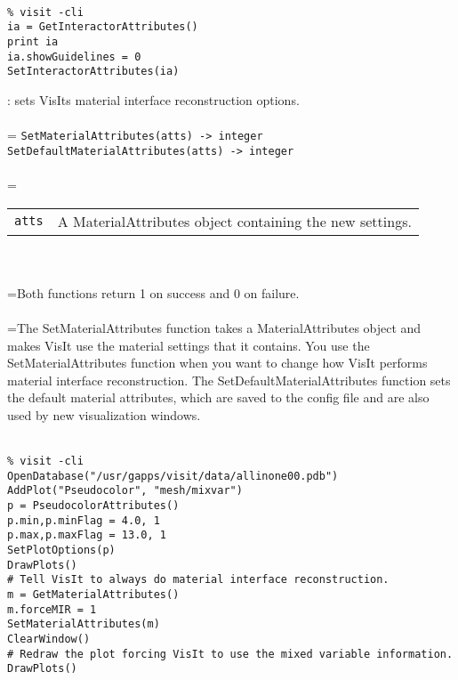 \documentclass[10pt,a4paper]{report}
\begin{document}
\\[-6mm]
\begin{verbatim}% visit -cli
ia = GetInteractorAttributes()
print ia
ia.showGuidelines = 0
SetInteractorAttributes(ia)
\end{verbatim}
\newpage


{}
: sets VisIts material interface reconstruction options.\\[-3mm]

 \\ 
\hangindent=\parindent 
\verb!SetMaterialAttributes(atts) -> integer!\\ 
\verb!SetDefaultMaterialAttributes(atts) -> integer!\\ [-3mm]

 \\ 
\hangindent=\parindent 
\begin{tabular}{lp{9cm}}
\verb!atts! & A MaterialAttributes object containing the new settings. \\
\end{tabular} \\[-2mm]


 \\ 
\hangindent=\parindent Both functions return 1 on success and 0 on failure. \\[-3mm] 

 \\ 
\hangindent=\parindent The SetMaterialAttributes function takes a MaterialAttributes object and makes VisIt use the material settings that it contains. You use the SetMaterialAttributes function when you want to change how VisIt performs material interface reconstruction. The SetDefaultMaterialAttributes function sets the default material attributes, which are saved to the config file and are also used by new visualization windows. \\[-3mm] 

\\[-6mm]
\begin{verbatim}% visit -cli
OpenDatabase("/usr/gapps/visit/data/allinone00.pdb")
AddPlot("Pseudocolor", "mesh/mixvar")
p = PseudocolorAttributes()
p.min,p.minFlag = 4.0, 1
p.max,p.maxFlag = 13.0, 1
SetPlotOptions(p)
DrawPlots()
# Tell VisIt to always do material interface reconstruction.
m = GetMaterialAttributes()
m.forceMIR = 1
SetMaterialAttributes(m)
ClearWindow()
# Redraw the plot forcing VisIt to use the mixed variable information.
DrawPlots()
\end{verbatim}
\newpage
\end{document}
